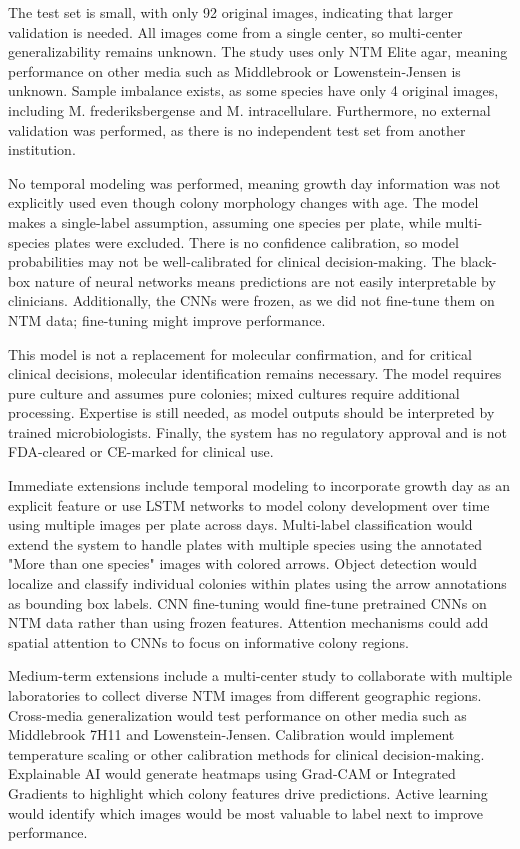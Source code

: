 \documentclass[journal,article,submit,pdftex,moreauthors]{Definitions/mdpi}
\begin{document}
The test set is small, with only 92 original images, indicating that larger validation is 
needed. All images come from a single center, so multi-center generalizability remains 
unknown. The study uses only NTM Elite agar, meaning performance on other media 
such as Middlebrook or Lowenstein-Jensen is unknown. Sample imbalance exists, as 
some species have only 4 original images, including M. frederiksbergense and M. 
intracellulare. Furthermore, no external validation was performed, as there is no 
independent test set from another institution.  

No temporal modeling was performed, meaning growth day information was not 
explicitly used even though colony morphology changes with age. The model makes a 
single-label assumption, assuming one species per plate, while multi-species plates 
were excluded. There is no confidence calibration, so model probabilities may not be 
well-calibrated for clinical decision-making. The black-box nature of neural networks 
means predictions are not easily interpretable by clinicians. Additionally, the CNNs were 
frozen, as we did not fine-tune them on NTM data; fine-tuning might improve 
performance.  

This model is not a replacement for molecular confirmation, and for critical clinical 
decisions, molecular identification remains necessary. The model requires pure culture 
and assumes pure colonies; mixed cultures require additional processing. Expertise is 
still needed, as model outputs should be interpreted by trained microbiologists. Finally, 
the system has no regulatory approval and is not FDA-cleared or CE-marked for clinical 
use.  

Immediate extensions include temporal modeling to incorporate growth day as an 
explicit feature or use LSTM networks to model colony development over time using 
multiple images per plate across days. Multi-label classification would extend the 
system to handle plates with multiple species using the annotated "More than one 
species" images with colored arrows. Object detection would localize and classify 
individual colonies within plates using the arrow annotations as bounding box labels. 
CNN fine-tuning would fine-tune pretrained CNNs on NTM data rather than using frozen 
features. Attention mechanisms could add spatial attention to CNNs to focus on 
informative colony regions.  

Medium-term extensions include a multi-center study to collaborate with multiple 
laboratories to collect diverse NTM images from different geographic regions. 
Cross-media generalization would test performance on other media such as 
Middlebrook 7H11 and Lowenstein-Jensen. Calibration would implement temperature 
scaling or other calibration methods for clinical decision-making. Explainable AI would 
generate heatmaps using Grad-CAM or Integrated Gradients to highlight which colony 
features drive predictions. Active learning would identify which images would be most 
valuable to label next to improve performance.  
\end{document}
